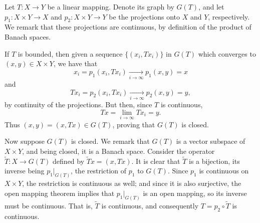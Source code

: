 \documentclass[12pt]{article}
\begin{document}
Let $T\colon X\to Y$ be a linear mapping. Denote its graph by $G(T)$, and let $p_1\colon X\times Y\to X$ and $p_2\colon X\times Y\to Y$ be the projections onto $X$ and $Y$, respectively. We remark that these projections are continuous, by definition of the product of Banach spaces.

If $T$ is bounded, then given a sequence 
$\{(x_i, Tx_i)\}$ in $G(T)$ which converges to $(x,y)\in X\times Y$, we have that $$x_i = p_1(x_i,Tx_i) \xrightarrow[i\to\infty]{} p_1(x,y) = x$$ 
and  $$Tx_i = p_2(x_i,Tx_i) \xrightarrow[i\to\infty]{} p_2(x,y) = y,$$
by continuity of the projections. 
But then, since $T$ is continuous,
$$Tx = \lim_{i\to\infty} Tx_i = y.$$
Thus $(x,y) = (x,Tx)\in G(T)$, proving that $G(T)$ is closed.

Now suppose $G(T)$ is closed. We remark that $G(T)$ is a vector subspace of $X\times Y$, and being closed, it is a Banach space. Consider the operator 
$\tilde T:X\to G(T)$ defined by $\tilde Tx = (x,Tx)$. It is clear that $\tilde T$ is a bijection, its inverse being $p_1|_{G(T)}$, the restriction of $p_1$ to $G(T)$. Since $p_1$ is continuous on $X\times Y$, the restriction is continuous as well; and since it is also surjective, the open mapping theorem implies that $p_1|_{G(T)}$ is an open mapping, so its inverse must be continuous. That is, $\tilde T$ is continuous, and consequently $T = p_2\circ\tilde T$ is continuous.
\end{document}
